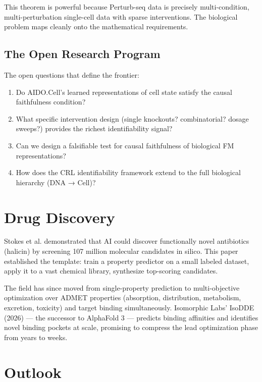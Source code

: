\documentclass[11pt]{article}
\begin{document}
This theorem is powerful because Perturb-seq data is precisely multi-condition, multi-perturbation single-cell data with sparse interventions. The biological problem maps cleanly onto the mathematical requirements.

\subsection{The Open Research Program}

The open questions that define the frontier:
\begin{enumerate}
\item Do AIDO.Cell's learned representations of cell state satisfy the causal faithfulness condition?
\item What specific intervention design (single knockouts? combinatorial? dosage sweeps?) provides the richest identifiability signal?
\item Can we design a falsifiable test for causal faithfulness of biological FM representations?
\item How does the CRL identifiability framework extend to the full biological hierarchy (DNA → Cell)?
\end{enumerate}

\section{Drug Discovery}

Stokes et al. \citep{stokes2020deep} demonstrated that AI could discover functionally novel antibiotics (halicin) by screening 107 million molecular candidates in silico. This paper established the template: train a property predictor on a small labeled dataset, apply it to a vast chemical library, synthesize top-scoring candidates.

The field has since moved from single-property prediction to multi-objective optimization over ADMET properties (absorption, distribution, metabolism, excretion, toxicity) and target binding simultaneously. Isomorphic Labs' IsoDDE (2026) --- the successor to AlphaFold 3 --- predicts binding affinities and identifies novel binding pockets at scale, promising to compress the lead optimization phase from years to weeks.

\section{Outlook}
\end{document}
